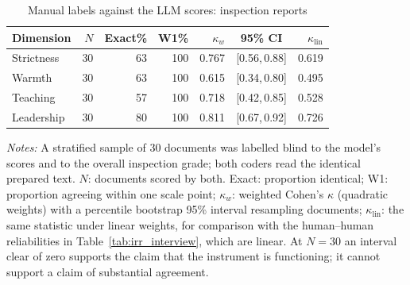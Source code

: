 \begin{table}[htbp]
\centering
\caption{Manual labels against the LLM scores: inspection reports}
\label{tab:irr_llm_ofsted}

\small
\begin{tabular}{lrrrrcr}
\toprule
Dimension & $N$ & Exact\% & W1\% & $\kappa_w$ & 95\% CI & $\kappa_{\text{lin}}$ \\
\midrule
Strictness & 30 & 63 & 100 & 0.767 & [0.56,\,0.88] & 0.619 \\
Warmth & 30 & 63 & 100 & 0.615 & [0.34,\,0.80] & 0.495 \\
Teaching & 30 & 57 & 100 & 0.718 & [0.42,\,0.85] & 0.528 \\
Leadership & 30 & 80 & 100 & 0.811 & [0.67,\,0.92] & 0.726 \\
\bottomrule
\end{tabular}
\begin{minipage}{\linewidth}
\smallskip
\footnotesize\textit{Notes:} A stratified sample of 30 documents was labelled blind to the model's scores and to the overall inspection grade; both coders read the identical prepared text. $N$: documents scored by both. Exact: proportion identical; W1: proportion agreeing within one scale point; $\kappa_w$: weighted Cohen's $\kappa$ (quadratic weights) with a percentile bootstrap 95\% interval resampling documents; $\kappa_{\text{lin}}$: the same statistic under linear weights, for comparison with the human--human reliabilities in Table~\ref{tab:irr_interview}, which are linear. At $N=30$ an interval clear of zero supports the claim that the instrument is functioning; it cannot support a claim of substantial agreement.
\end{minipage}
\end{table}
